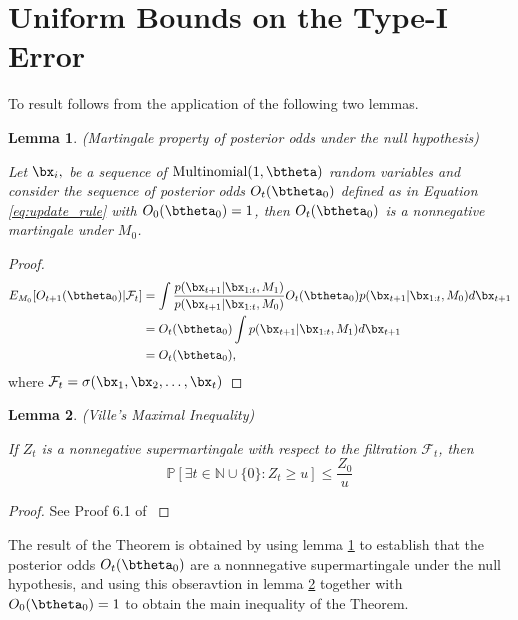 \documentclass[11pt]{article}
\newtheorem{lemma}{Lemma}[section]
\begin{document}
\section{Uniform Bounds on the Type-I Error}
\label{app:type_1_error}
To result follows from the application of the following two lemmas.
\begin{lemma}(Martingale property of posterior odds under the null hypothesis)
  
  \noindent Let $\bx_i,$ be a sequence of $\text{Multinomial}(1,\btheta)$ random variables and consider the sequence of posterior odds $O_t(\btheta_0)$ defined as in Equation \eqref{eq:update_rule} with $O_0(\btheta_0)=1$, then $O_t(\btheta_0)$ is a nonnegative martingale under $M_0$.
  \label{lem:posterior_odds_martingale}
    \end{lemma}
  \begin{proof}
  \begin{align*}
    E_{M_0}[O_{t+1}(\btheta_0)|\mathcal{F}_t]  &= \int \frac{p(\bx_{t+1}|\bx_{1:t},M_1)}{p(\bx_{t+1}|\bx_{1:t},M_0)} O_{t}(\btheta_0) p(\bx_{t+1}|\bx_{1:t},M_0) d\bx_{t+1}\\
    &=  O_{t}(\btheta_0) \int p(\bx_{t+1}|\bx_{1:t},M_1) d\bx_{t+1}\\
    &=  O_{t}(\btheta_0),
  \end{align*}
  where $\mathcal{F}_{t} = \sigma(\bx_1,\bx_2,\dots, \bx_t)$
\end{proof}

\begin{lemma}(Ville's Maximal Inequality)
  
\label{lem:durrett}
  \noindent If $Z_{t}$ is a nonnegative supermartingale with respect to the filtration $\mathcal{F}_t$, then
  \begin{equation}
    \label{eq:durrett}
    \mathbb{P}[\exists t \in \mathbb{N}\cup \lbrace 0 \rbrace : Z_t \geq u] \leq \frac{Z_0}{u}
  \end{equation}
\end{lemma}
\begin{proof}
  See Proof 6.1 of \cite{howard}
\end{proof}
The result of the Theorem is obtained by using lemma \ref{lem:posterior_odds_martingale} to establish that the posterior odds $O_t(\btheta_0)$ are a nonnnegative supermartingale under the null hypothesis, and using this obseravtion in lemma \ref{lem:durrett} together with  $O_0(\btheta_0) = 1$  to obtain the main inequality of the Theorem.
\end{document}
